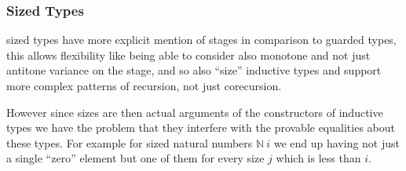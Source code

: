 \documentclass{book}
\newcommand{\sNat}{\mathbb{N}}
\begin{document}




\subsubsection{Sized Types}

sized types have more explicit mention of stages in comparison to
guarded types, this allows flexibility like being able to consider
also monotone and not just antitone variance on the stage, and so also
``size'' inductive types and support more complex patterns of
recursion, not just corecursion.

However since sizes are then actual arguments of the constructors of
inductive types we have the problem that they interfere with the
provable equalities about these types. For example for sized natural
numbers $\sNat~i$ we end up having not just a single ``zero'' element
but one of them for every size $j$ which is less than $i$.
\end{document}
